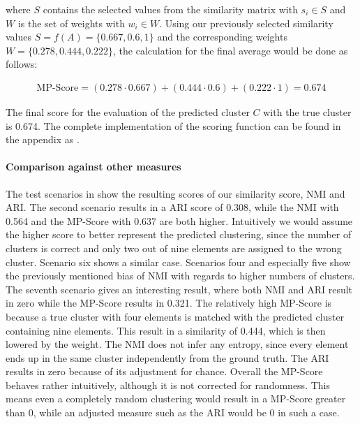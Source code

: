 where $S$ contains the selected values from the similarity matrix
with $s_{i} \in S$ and $W$ is the set of weights with $w_i \in W$.
Using our previously selected similarity values $S = f(A) = \{0.667, 0.6, 1\}$
and the corresponding weights $W = \{0.278, 0.444, 0.222\}$,
the calculation for the final average would be done as follows:

\begin{align*}
    \text{MP-Score} = (0.278 \cdot 0.667) + (0.444 \cdot 0.6) + (0.222 \cdot 1) = \mathbf{0.674}
\end{align*}

The final score for the evaluation of the predicted cluster $C$ with the true cluster is 0.674.
The complete implementation of the scoring function can be found in the appendix as .

\paragraph{Comparison against other measures}
The test scenarios in  show the resulting scores of our similarity score, NMI and ARI.
The second scenario results in a ARI score of 0.308,
while the NMI with 0.564 and the MP-Score with 0.637 are both higher.
Intuitively we would assume the higher score to better represent the predicted clustering,
since the number of clusters is correct and only two out of nine elements are assigned to the wrong cluster.
Scenario six shows a similar case.
Scenarios four and especially five show the previously mentioned bias of NMI with regards to higher numbers of clusters.
The seventh scenario gives an interesting result,
where both NMI and ARI result in zero while the MP-Score results in 0.321.
The relatively high MP-Score is because a true cluster with four elements is matched
with the predicted cluster containing nine elements.
This result in a similarity of 0.444, which is then lowered by the weight.
The NMI does not infer any entropy, since every element ends up in the same cluster independently from the ground truth.
The ARI results in zero because of its adjustment for chance.
Overall the MP-Score behaves rather intuitively, although it is not corrected for randomness.
This means even a completely random clustering would result in a MP-Score greater than 0,
while an adjusted measure such as the ARI would be 0 in such a case.

